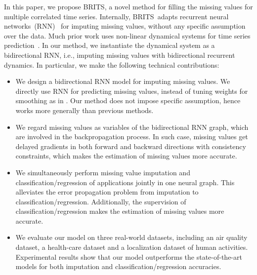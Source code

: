 \documentclass{article}
\newcommand{\methodname}{\xspace{BRITS}}
\begin{document}
In this paper, we propose \methodname, a novel method for filling the missing values for multiple correlated time series. 
Internally, \methodname ~adapts recurrent neural networks~(RNN)~\cite{hochreiter1997long,cho2014learning} for imputing missing values, without any specific assumption over the data.
Much prior work uses non-linear dynamical systems for time series prediction~\cite{brakel2013training,ozaki19852,basharat2009time}.
In our method, we instantiate the dynamical system as a bidirectional RNN, i.e., imputing missing values with bidirectional recurrent dynamics.
In particular, we make the following technical contributions: 
\begin{itemize}
\item 
We design a bidirectional RNN model for imputing missing values.
We directly use RNN for predicting missing values, instead of tuning weights for smoothing as in \cite{che2018recurrent}. 
Our method does not impose specific assumption, hence works more generally than previous methods.
\item 
We regard missing values as variables of the bidirectional RNN graph, which are involved in the backpropagation process. 
In such case, missing values get delayed gradients in both forward and backward directions with consistency constraints, which makes the estimation of missing values more accurate.
\item We simultaneously perform missing value imputation and classification/regression of applications jointly in one neural graph.
This alleviates the error propagation problem from imputation to classification/regression. 
Additionally, the supervision of classification/regression makes the estimation of missing values more accurate.
\item We evaluate our model on three real-world datasets, including an air quality dataset, a health-care dataset and a localization dataset of human activities. Experimental results show that our model outperforms the state-of-the-art models for both imputation and classification/regression accuracies.


\end{itemize}

%
\end{document}
